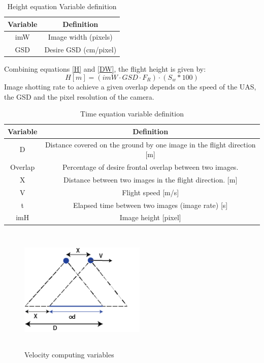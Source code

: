 \begin{table}[H]
\centering
\begin{tabular}{|c|c|}
\hline
\textbf{Variable} & \textbf{Definition}   \\ \hline
imW              & Image width (pixels)  \\ \hline
GSD               & Desire GSD (cm/pixel) \\ \hline
\end{tabular}
\caption{Height equation Variable definition}
\end{table}
Combining equations \ref{H} and \ref{DW}, the flight height is given by:
\begin{equation}
H[m]=(imW\cdot GSD \cdot F_{R})\cdot (S_{w}*100)
\end{equation}
Image shotting rate to achieve a given overlap depends on the speed of the UAS, the GSD and the pixel resolution of the camera.
\begin{table}[H]
\centering
\begin{tabular}{|c|c|}
\hline
Variable & Definition                                                                  \\ \hline
D        & Distance covered on the ground by one image in the flight direction {[}m{]} \\ \hline
Overlap  & Percentage of desire frontal overlap between two images.                    \\ \hline
X        & Distance between two images in the flight direction. {[}m{]}                \\ \hline
V        & Flight speed {[}m/s{]}                                                      \\ \hline
t        & Elapsed time between two images (image rate) {[}s{]}                        \\ \hline
imH      & Image height {[}pixel{]}                                                    \\ \hline
\end{tabular}
\caption{Time equation variable definition}
\end{table}
\begin{figure}[H]
\centering
\includegraphics[width=6cm,height=6cm,keepaspectratio]{imagenes/Velocity.png}
\caption{Velocity computing variables}
\label{fig:velocity}
\end{figure}
